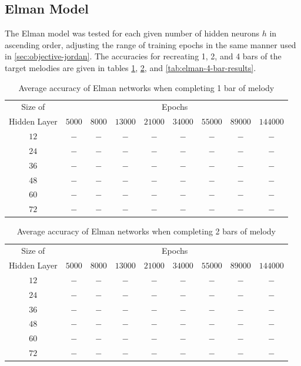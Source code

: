 \documentclass[ author={Stephen Livermore-Tozer},
				supervisor={Dr. Peter Flach},
				degree={MEng},
				title={Algorithmic Co-composition Using Machine Learning},
				subtitle={},
				type={research},
				year={2016} ]{dissertation}
\begin{document}
	\subsection{Elman Model}
	
	The Elman model was tested for each given number of hidden neurons $h$ in ascending order, adjusting the range of training epochs in the same manner used in \ref{sec:objective-jordan}. The accuracies for recreating 1, 2, and 4 bars of the target melodies are given in tables \ref{tab:elman-1-bar-results}, \ref{tab:elman-2-bar-results}, and \ref{tab:elman-4-bar-results}.
	
	\begin{table}[htp]
		\begin{center}
			\begin{tabular}{ccccccccc}
				\toprule
				Size of& \multicolumn{8}{c}{Epochs}\\
				\cline{2-9}
				Hidden Layer& $5000$ & $8000$ & $13000$ & $21000$ & $34000$ & $55000$ & $89000$ & $144000$\\
				\hline
				$12$ & $-$ & $-$ & $-$ & $-$ & $-$ & $-$ & $-$ & $-$\\
				$24$ & $-$ & $-$ & $-$ & $-$ & $-$ & $-$ & $-$ & $-$\\
				$36$ & $-$ & $-$ & $-$ & $-$ & $-$ & $-$ & $-$ & $-$\\
				$48$ & $-$ & $-$ & $-$ & $-$ & $-$ & $-$ & $-$ & $-$\\
				$60$ & $-$ & $-$ & $-$ & $-$ & $-$ & $-$ & $-$ & $-$\\
				$72$ & $-$ & $-$ & $-$ & $-$ & $-$ & $-$ & $-$ & $-$\\
				\bottomrule
			\end{tabular}
		\end{center}
		\caption{Average accuracy of Elman networks when completing 1 bar of melody}
		\label{tab:elman-1-bar-results}
	\end{table}
	
	\begin{table}[htp]
		\begin{center}
			\begin{tabular}{ccccccccc}
				\toprule
				Size of& \multicolumn{8}{c}{Epochs}\\
				\cline{2-9}
				Hidden Layer& $5000$ & $8000$ & $13000$ & $21000$ & $34000$ & $55000$ & $89000$ & $144000$\\
				\hline
				$12$ & $-$ & $-$ & $-$ & $-$ & $-$ & $-$ & $-$ & $-$\\
				$24$ & $-$ & $-$ & $-$ & $-$ & $-$ & $-$ & $-$ & $-$\\
				$36$ & $-$ & $-$ & $-$ & $-$ & $-$ & $-$ & $-$ & $-$\\
				$48$ & $-$ & $-$ & $-$ & $-$ & $-$ & $-$ & $-$ & $-$\\
				$60$ & $-$ & $-$ & $-$ & $-$ & $-$ & $-$ & $-$ & $-$\\
				$72$ & $-$ & $-$ & $-$ & $-$ & $-$ & $-$ & $-$ & $-$\\
				\bottomrule
			\end{tabular}
		\end{center}
		\caption{Average accuracy of Elman networks when completing 2 bars of melody}
		\label{tab:elman-2-bar-results}
	\end{table}
	
\end{document}
